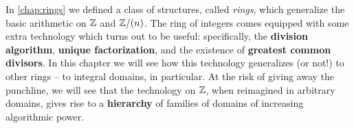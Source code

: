 In \autoref{chap:rings} we defined a class of structures, called \emph{rings}, which generalize the basic arithmetic on \(\mathbb{Z}\) and \(\mathbb{Z}/(n)\).
The ring of integers comes equipped with some extra technology which turns out to be useful: specifically, the \textbf{division algorithm}, \textbf{unique factorization}, and the existence of \textbf{greatest common divisors}.
In this chapter we will see how this technology generalizes (or not!) to other rings -- to integral domains, in particular.
At the risk of giving away the punchline, we will see that the technology on \(\mathbb{Z}\), when reimagined in arbitrary domains, gives rise to a \textbf{hierarchy} of families of domains of increasing algorithmic power.

